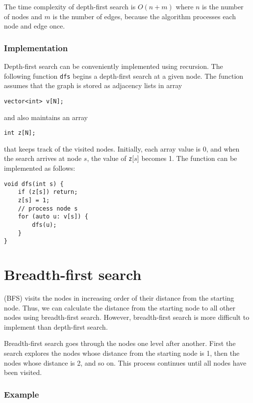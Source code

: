 The time complexity of depth-first search is $O(n+m)$
where $n$ is the number of nodes and $m$ is the
number of edges,
because the algorithm processes each node and edge once.

\subsubsection*{Implementation}

Depth-first search can be conveniently
implemented using recursion.
The following function \texttt{dfs} begins
a depth-first search at a given node.
The function assumes that the graph is
stored as adjacency lists in array
\begin{lstlisting}
vector<int> v[N];
\end{lstlisting}
and also maintains an array
\begin{lstlisting}
int z[N];
\end{lstlisting}
that keeps track of the visited nodes.
Initially, each array value is 0,
and when the search arrives at node $s$,
the value of \texttt{z}[$s$] becomes 1.
The function can be implemented as follows:
\begin{lstlisting}
void dfs(int s) {
    if (z[s]) return;
    z[s] = 1;
    // process node s
    for (auto u: v[s]) {
        dfs(u);
    }
}
\end{lstlisting}

\section{Breadth-first search}


 (BFS) visits the nodes
in increasing order of their distance
from the starting node.
Thus, we can calculate the distance
from the starting node to all other
nodes using breadth-first search.
However, breadth-first search is more difficult
to implement than depth-first search.

Breadth-first search goes through the nodes
one level after another.
First the search explores the nodes whose
distance from the starting node is 1,
then the nodes whose distance is 2, and so on.
This process continues until all nodes
have been visited.

\subsubsection*{Example}


